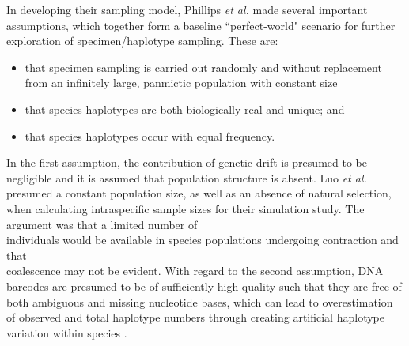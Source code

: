 In developing their sampling model, Phillips \textit{et al.} \cite{phillips2015exploration} made several important \\ assumptions, which together form a baseline ``perfect-world" scenario for further \\ exploration of specimen/haplotype sampling. These are:

\begin{itemize}

\item that specimen sampling is carried out randomly and without replacement from an infinitely large, panmictic population with constant size

\vspace{1mm}

\item that species haplotypes are both biologically real and unique; and

\vspace{1mm}

\item that species haplotypes occur with equal frequency.

\end{itemize}



In the first assumption, the contribution of genetic drift is presumed to be negligible and it is assumed that population structure is absent. Luo \textit{et al.} \cite{luo2015simulation} presumed a constant population size, as well as an absence of natural selection, when calculating intraspecific sample sizes for their simulation study. The argument was that a limited number of \\ individuals would be available in species populations undergoing contraction and that \\ coalescence may not be evident. With regard to the second assumption, DNA barcodes are presumed to be of sufficiently high quality such that they are free of both ambiguous and missing nucleotide bases, which can lead to overestimation of observed and total haplotype numbers through creating artificial haplotype variation within species \cite{athey2013assessing, dasmahapatra2010mitochondrial, phillips2015exploration, stoeckle2012frequency, stoeckle2014dna}.



